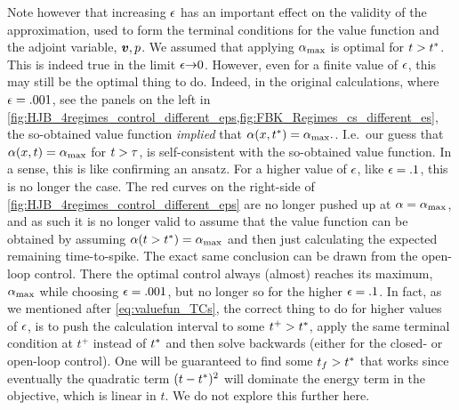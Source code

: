 \documentclass[12pt]{iopart}
\begin{document}
Note however that increasing ${\epsilon}$ has an important effect on the validity of
the approximation, used to form the terminal conditions for
the value function and the adjoint variable, ${ \boldsymbol{v} },p$. We assumed that applying
${ {\alpha}_{\textrm{max}} }$ is optimal for $t>{ t^* }$. This is indeed true in the
limit ${\epsilon} {\rightarrow} 0$. However, even for a finite value of ${\epsilon}$, this may still
be the optimal thing to do. Indeed, in the original calculations,
where ${\epsilon}=.001$, see the panels on the left in
\cref{fig:HJB_4regimes_control_different_eps,fig:FBK_Regimes_cs_different_es},
the so-obtained value function {\sl implied} that ${\alpha}(x,{ t^* }) = { {\alpha}_{\textrm{max}} }.$. I.e.\ our
guess that ${\alpha}(x, t) = { {\alpha}_{\textrm{max}} }$ for $t > {\tau}$, is self-consistent with the
so-obtained value function. In a sense, this is like confirming an ansatz. For a higher
value of ${\epsilon}$, like ${\epsilon} = .1$, this is no longer the case. The red
curves on the right-side of \cref{fig:HJB_4regimes_control_different_eps} are no
longer pushed up at ${\alpha} = { {\alpha}_{\textrm{max}} }$, and as such it is no longer valid to
assume that the value function can be obtained by assuming ${\alpha}(t>{ t^* }) = { {\alpha}_{\textrm{max}} }$
and then just calculating the expected remaining time-to-spike.
The exact same conclusion can be drawn from the open-loop control. There the
optimal control always (almost) reaches its maximum, ${ {\alpha}_{\textrm{max}} }$ while choosing
${\epsilon} = .001$, but no longer so for the higher ${\epsilon} = .1$.
In fact, as we mentioned after \cref{eq:valuefun_TCs}, the correct thing to do
for higher values of ${\epsilon}$, is to push the
calculation interval to some $t^+ > { t^* }$, apply the same terminal condition at
$t^+$ instead of ${ t^* }$ and then solve backwards (either for the closed- or
open-loop control). One will be guaranteed to find some $t_f > { t^* }$ that works
since eventually the quadratic term $(t-{ t^* })^2$ will dominate the energy term in
the objective, which is linear in $t$. We do not explore this further here.
\end{document}

